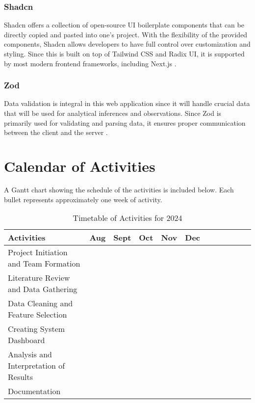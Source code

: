 \subsubsection{Shadcn}
Shadcn offers a collection of open-source UI boilerplate components that can be directly copied and pasted into one's project. With the flexibility of the provided components, Shadcn allows developers to have full control over customization and styling. Since this is built on top of Tailwind CSS and Radix UI, it is supported by most modern frontend frameworks, including Next.js \cite{shadcn-no-date}.

\subsubsection{Zod}
Data validation is integral in this web application since it will handle crucial data that will be used for analytical inferences and observations. Since Zod is primarily used for validating and parsing data, it ensures proper communication between the client and the server \cite{zod-nd}. 


\clearpage
\section{Calendar of Activities}

A Gantt chart showing the schedule of the activities is included below. Each bullet represents approximately one week of activity.

\newcommand{\weekone}{\textbullet}
\newcommand{\weektwo}{\textbullet \textbullet}
\newcommand{\weekthree}{\textbullet \textbullet \textbullet}
\newcommand{\weekfour}{\textbullet \textbullet \textbullet \textbullet}

\begin{table}[ht]
	\centering
	\caption{Timetable of Activities for 2024} \vspace{0.25em}
	\begin{tabular}{|p{2in}|c|c|c|c|c|c|c|c|c|c|c|} \hline
		Activities & Aug & Sept & Oct & Nov & Dec \\ \hline
		Project Initiation and Team Formation & \weektwo & & & & \\ \hline
		Literature Review and Data Gathering & \weektwo & \weekfour & & & \\ \hline
		Data Cleaning and Feature Selection & & \weektwo & & \weekone & \weekone \\ \hline
		Creating System Dashboard & & \weektwo & \weekfour & \weekone & \\ \hline
		Analysis and Interpretation of Results & & & \weekone & & \weekone  \\ \hline	
		Documentation & \weektwo & \weekfour & \weekfour & \weekfour & \weekfour  \\ \hline	
	\end{tabular}
	\label{tab:timetableactivities2024}
\end{table}

